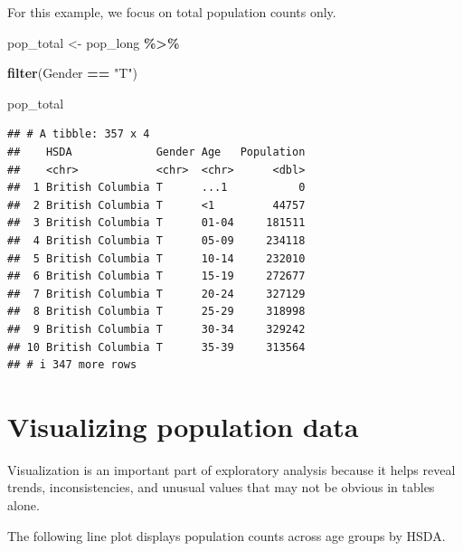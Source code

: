 \documentclass[
  11pt,
  oneside]{book}
\newenvironment{Shaded}{\begin{snugshade}}{\end{snugshade}}
\newcommand{\FunctionTok}[1]{\textcolor[rgb]{0.13,0.29,0.53}{\textbf{#1}}}
\newcommand{\NormalTok}[1]{#1}
\newcommand{\OtherTok}[1]{\textcolor[rgb]{0.56,0.35,0.01}{#1}}
\newcommand{\SpecialCharTok}[1]{\textcolor[rgb]{0.81,0.36,0.00}{\textbf{#1}}}
\newcommand{\StringTok}[1]{\textcolor[rgb]{0.31,0.60,0.02}{#1}}
\begin{document}
For this example, we focus on total population counts only.

\begin{Shaded}
\begin{Highlighting}[]
\NormalTok{pop\_total }\OtherTok{\textless{}{-}}\NormalTok{ pop\_long }\SpecialCharTok{\%\textgreater{}\%}
  
  \FunctionTok{filter}\NormalTok{(Gender }\SpecialCharTok{==} \StringTok{"T"}\NormalTok{)}

\NormalTok{pop\_total}
\end{Highlighting}
\end{Shaded}

\begin{verbatim}
## # A tibble: 357 x 4
##    HSDA             Gender Age   Population
##    <chr>            <chr>  <chr>      <dbl>
##  1 British Columbia T      ...1           0
##  2 British Columbia T      <1         44757
##  3 British Columbia T      01-04     181511
##  4 British Columbia T      05-09     234118
##  5 British Columbia T      10-14     232010
##  6 British Columbia T      15-19     272677
##  7 British Columbia T      20-24     327129
##  8 British Columbia T      25-29     318998
##  9 British Columbia T      30-34     329242
## 10 British Columbia T      35-39     313564
## # i 347 more rows
\end{verbatim}

\section{Visualizing population data}\label{visualizing-population-data}

Visualization is an important part of exploratory analysis because it helps reveal trends, inconsistencies, and unusual values that may not be obvious in tables alone.

The following line plot displays population counts across age groups by HSDA.
\end{document}

